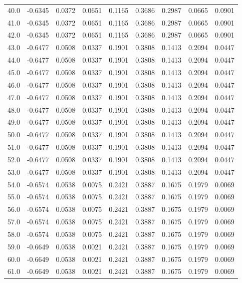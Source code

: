 \begin{longtable}{lrrrrrrrr}
40.0 & -0.6345 & 0.0372 & 0.0651 & 0.1165 & 0.3686 & 0.2987 & 0.0665 & 0.0901 \\
41.0 & -0.6345 & 0.0372 & 0.0651 & 0.1165 & 0.3686 & 0.2987 & 0.0665 & 0.0901 \\
42.0 & -0.6345 & 0.0372 & 0.0651 & 0.1165 & 0.3686 & 0.2987 & 0.0665 & 0.0901 \\
43.0 & -0.6477 & 0.0508 & 0.0337 & 0.1901 & 0.3808 & 0.1413 & 0.2094 & 0.0447 \\
44.0 & -0.6477 & 0.0508 & 0.0337 & 0.1901 & 0.3808 & 0.1413 & 0.2094 & 0.0447 \\
45.0 & -0.6477 & 0.0508 & 0.0337 & 0.1901 & 0.3808 & 0.1413 & 0.2094 & 0.0447 \\
46.0 & -0.6477 & 0.0508 & 0.0337 & 0.1901 & 0.3808 & 0.1413 & 0.2094 & 0.0447 \\
47.0 & -0.6477 & 0.0508 & 0.0337 & 0.1901 & 0.3808 & 0.1413 & 0.2094 & 0.0447 \\
48.0 & -0.6477 & 0.0508 & 0.0337 & 0.1901 & 0.3808 & 0.1413 & 0.2094 & 0.0447 \\
49.0 & -0.6477 & 0.0508 & 0.0337 & 0.1901 & 0.3808 & 0.1413 & 0.2094 & 0.0447 \\
50.0 & -0.6477 & 0.0508 & 0.0337 & 0.1901 & 0.3808 & 0.1413 & 0.2094 & 0.0447 \\
51.0 & -0.6477 & 0.0508 & 0.0337 & 0.1901 & 0.3808 & 0.1413 & 0.2094 & 0.0447 \\
52.0 & -0.6477 & 0.0508 & 0.0337 & 0.1901 & 0.3808 & 0.1413 & 0.2094 & 0.0447 \\
53.0 & -0.6477 & 0.0508 & 0.0337 & 0.1901 & 0.3808 & 0.1413 & 0.2094 & 0.0447 \\
54.0 & -0.6574 & 0.0538 & 0.0075 & 0.2421 & 0.3887 & 0.1675 & 0.1979 & 0.0069 \\
55.0 & -0.6574 & 0.0538 & 0.0075 & 0.2421 & 0.3887 & 0.1675 & 0.1979 & 0.0069 \\
56.0 & -0.6574 & 0.0538 & 0.0075 & 0.2421 & 0.3887 & 0.1675 & 0.1979 & 0.0069 \\
57.0 & -0.6574 & 0.0538 & 0.0075 & 0.2421 & 0.3887 & 0.1675 & 0.1979 & 0.0069 \\
58.0 & -0.6574 & 0.0538 & 0.0075 & 0.2421 & 0.3887 & 0.1675 & 0.1979 & 0.0069 \\
59.0 & -0.6649 & 0.0538 & 0.0021 & 0.2421 & 0.3887 & 0.1675 & 0.1979 & 0.0069 \\
60.0 & -0.6649 & 0.0538 & 0.0021 & 0.2421 & 0.3887 & 0.1675 & 0.1979 & 0.0069 \\
61.0 & -0.6649 & 0.0538 & 0.0021 & 0.2421 & 0.3887 & 0.1675 & 0.1979 & 0.0069 \\

\end{longtable}
